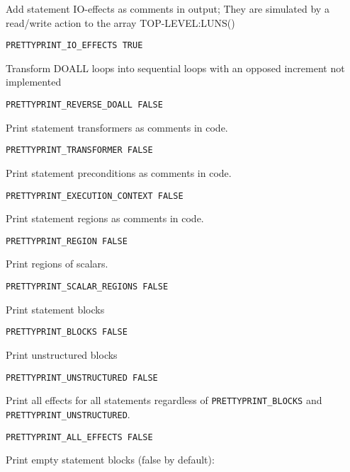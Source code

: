 Add statement IO-effects as comments in output; They are simulated by
a read/write action to the array TOP-LEVEL:LUNS()

\begin{verbatim}
PRETTYPRINT_IO_EFFECTS TRUE
\end{verbatim}

Transform DOALL loops into sequential loops with an opposed increment
not implemented

\begin{verbatim}
PRETTYPRINT_REVERSE_DOALL FALSE
\end{verbatim}

Print statement transformers as comments in code.

\begin{verbatim}
PRETTYPRINT_TRANSFORMER FALSE
\end{verbatim}

Print statement preconditions as comments in code.

\begin{verbatim}
PRETTYPRINT_EXECUTION_CONTEXT FALSE
\end{verbatim}

Print statement regions as comments in code.

\begin{verbatim}
PRETTYPRINT_REGION FALSE
\end{verbatim}

Print regions of scalars.

\begin{verbatim}
PRETTYPRINT_SCALAR_REGIONS FALSE
\end{verbatim}

Print statement blocks

\begin{verbatim}
PRETTYPRINT_BLOCKS FALSE
\end{verbatim}

Print unstructured blocks

\begin{verbatim}
PRETTYPRINT_UNSTRUCTURED FALSE
\end{verbatim}

Print all effects for all statements regardless of \verb+PRETTYPRINT_BLOCKS+
and \verb+PRETTYPRINT_UNSTRUCTURED+.

\begin{verbatim}
PRETTYPRINT_ALL_EFFECTS FALSE
\end{verbatim}

Print empty statement blocks (false by default):

